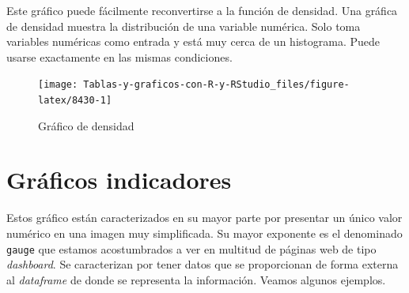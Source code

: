 \documentclass[
]{book}
\newenvironment{Shaded}{\begin{snugshade}}{\end{snugshade}}
\newcommand{\AttributeTok}[1]{\textcolor[rgb]{0.77,0.63,0.00}{#1}}
\newcommand{\ConstantTok}[1]{\textcolor[rgb]{0.00,0.00,0.00}{#1}}
\newcommand{\FunctionTok}[1]{\textcolor[rgb]{0.00,0.00,0.00}{#1}}
\newcommand{\NormalTok}[1]{#1}
\newcommand{\SpecialCharTok}[1]{\textcolor[rgb]{0.00,0.00,0.00}{#1}}
\newcommand{\StringTok}[1]{\textcolor[rgb]{0.31,0.60,0.02}{#1}}
\begin{document}
Este gráfico puede fácilmente reconvertirse a la función de densidad. Una gráfica de densidad muestra la distribución de una variable numérica. Solo toma variables numéricas como entrada y está muy cerca de un histograma. Puede usarse exactamente en las mismas condiciones.

\begin{Shaded}
\end{Shaded}

\begin{figure}[H]

{\centering \texttt{[image: Tablas-y-graficos-con-R-y-RStudio\_files/figure-latex/8430-1]} 

}

\caption{Gráfico de densidad}\label{fig:8430}
\end{figure}

\hypertarget{gruxe1ficos-indicadores}{%
\section{Gráficos indicadores}\label{gruxe1ficos-indicadores}}

Estos gráfico están caracterizados en su mayor parte por presentar un único valor numérico en una imagen muy simplificada. Su mayor exponente es el denominado \texttt{gauge} que estamos acostumbrados a ver en multitud de páginas web de tipo \emph{dashboard}. Se caracterizan por tener datos que se proporcionan de forma externa al \emph{dataframe} de donde se representa la información. Veamos algunos ejemplos.
\end{document}
